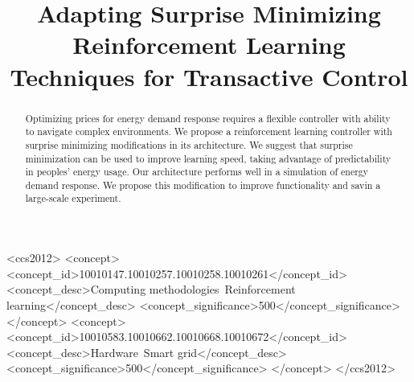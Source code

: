 \title{Adapting Surprise Minimizing Reinforcement Learning Techniques for Transactive Control}



\begin{abstract}
Optimizing prices for energy demand response requires a flexible controller with ability to navigate complex environments. 
We propose a reinforcement learning controller with surprise minimizing modifications in its architecture. 
We suggest that surprise minimization can be used to improve learning speed, taking advantage of predictability in peoples' energy usage. Our architecture performs well in a simulation of energy demand response. We propose this modification to improve functionality and savin a large-scale experiment.   
\end{abstract}



\begin{CCSXML}
<ccs2012>
   <concept>
       <concept_id>10010147.10010257.10010258.10010261</concept_id>
       <concept_desc>Computing methodologies~Reinforcement learning</concept_desc>
       <concept_significance>500</concept_significance>
       </concept>
   <concept>
       <concept_id>10010583.10010662.10010668.10010672</concept_id>
       <concept_desc>Hardware~Smart grid</concept_desc>
       <concept_significance>500</concept_significance>
       </concept>
 </ccs2012>
\end{CCSXML}


